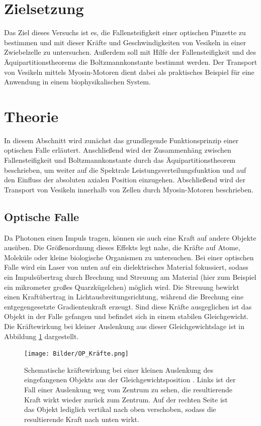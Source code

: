 \section*{Zielsetzung}
Das Ziel dieses Versuchs ist es, die Fallensteifigkeit einer optischen Pinzette zu bestimmen und mit dieser Kräfte und Geschwindigkeiten von Vesikeln in einer Zwiebelzelle zu untersuchen.
Außerdem soll mit Hilfe der Fallensteifigkeit und des Äquipartitionstheorems die Boltzmannkonstante bestimmt werden.
Der Transport von Vesikeln mittels Myosin-Motoren dient dabei als praktisches Beispiel für eine Anwendung in einem biophysikalischen System.

\section{Theorie}
In diesem Abschnitt wird zunächst das grundlegende Funktionsprinzip einer optischen Falle erläutert.
Anschließend wird der Zusammenhäng zwischen Fallensteifigkeit und Boltzmannkonstante durch das Äquipartitionstheorem beschrieben, um
weiter auf die Spektrale Leistungsverteilungsfunktion und auf den Einfluss der absoluten axialen Position einzugehen.
Abschließend wird der Transport von Vesikeln innerhalb von Zellen durch Myosin-Motoren beschrieben.
\subsection{Optische Falle}
Da Photonen einen Impuls tragen, können sie auch eine Kraft auf andere Objekte ausüben.
Die Größenordnung dieses Effekts legt nahe, die Kräfte auf Atome, Moleküle oder kleine biologische Organismen zu untersuchen.
Bei einer optischen Falle wird ein Laser von unten auf ein dielektrisches Material fokussiert, sodass ein Impulsübertrag durch 
Brechung und Streuung am Material (hier zum Beispiel ein mikrometer großes Quarzkügelchen) möglich wird.
Die Streuung bewirkt einen Kraftübertrag in Lichtausbreitungsrichtung, 
während die Brechung eine entgegengesetzte Gradientenkraft erzeugt. 
Sind diese Kräfte ausgeglichen ist das Objekt in der Falle gefangen 
und befindet sich in einem stabilen Gleichgewicht. Die Kräftewirkung bei kleiner Auslenkung
aus dieser Gleichgewichtslage ist in Abbildung \ref{fig:Kräfte} dargestellt.




\begin{figure}[H]
    \centering\captionsetup{format=plain}
    \texttt{[image: Bilder/OP\_Kräfte.png]}
    \caption{Schematische kräftewirkung bei einer kleinen Auslenkung des eingefangenen Objekts aus der Gleichgewichtsposition  \cite{ref10}. Links ist der Fall einer Auslenkung weg vom Zentrum zu sehen, die resultierende Kraft wirkt wieder zurück zum Zentrum. Auf der rechten Seite ist das Objekt lediglich vertikal nach oben verschoben, sodass die resultierende Kraft nach unten wirkt.}
    \label{fig:Kräfte}
\end{figure}

